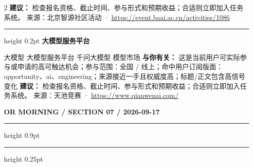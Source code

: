 \documentclass[10.5pt]{ctexart}
\begin{document}
\begin{multicols}{2}
\textbf{建议：} 检查报名资格、截止时间、参与形式和预期收益；合适则立即加入任务系统。
{\footnotesize\color{ormuted} 来源：北京智源社区活动 · \url{https://event.baai.ac.cn/activities/1086}}
\vspace{2mm}
\hrule height 0.2pt
\vspace{2mm}
{\large\bfseries 大模型服务平台}\par
大模型 大模型服务平台 千问大模型 模型市场
\textbf{与你有关：} 这是当前用户可实际参与或申请的高可触达机会；参与范围：全国 / 线上；命中用户订阅版面：opportunity、ai、engineering；来源接近一手且权威度高；标题/正文包含高信号变化
\textbf{建议：} 检查报名资格、截止时间、参与形式和预期收益；合适则立即加入任务系统。
{\footnotesize\color{ormuted} 来源：天池竞赛 · \url{https://www.qianwenai.com/}}
\end{multicols}
\newpage
{\small\bfseries OR MORNING / SECTION 07 / 2026-09-17}
\vspace{2mm}
\hrule height 0.9pt
\vspace{1.5mm}
\hrule height 0.25pt
\vspace{4mm}
\end{document}
